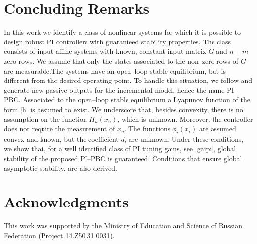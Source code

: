 \documentclass[10pt, conference]{ieeeconf}
\def\lab{\label}
\begin{document}
\section{Concluding Remarks}
\lab{sec7}	
In this work we identify a class of nonlinear systems for which it is possible to design robust PI controllers with guaranteed stability properties. The class consists of input affine systems with known, constant input matrix $G$ and $n-m$ zero rows. We assume that only the states associated to the non--zero rows of  $G$ are measurable.The systems  have an open--loop stable equilibrium, but is different from the desired operating point. To handle this situation, we follow \cite{JAYetal} and generate new passive outputs for the incremental model, hence the name PI--PBC. Associated to the open--loop stable equilibrium a  Lyapunov function of the form \eqref{h} is assumed to exist. We underscore that, besides convexity, there is no assumption on the function $H_u(x_u)$, which is unknown. Moreover,  the controller does not require the measurement of $x_u$. The functions $\phi_i(x_i)$ are assumed convex and known, but the coefficient $d_i$ are unknown. Under these conditions, we show that, for a well identified class of PI tuning gains, see \eqref{gaipi}, global stability of the proposed PI--PBC is guaranteed. Conditions that ensure global asymptotic stability, are also derived.  

\section*{Acknowledgments}


This work was supported by the Ministry of Education and Science of Russian Federation (Project 14.Z50.31.0031).




\end{document}
